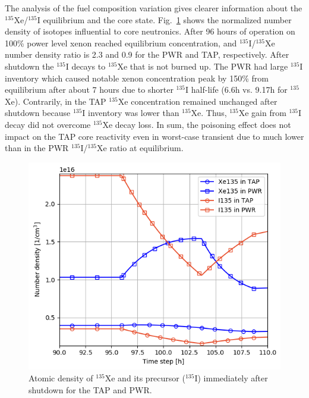 \documentclass{anstrans}
\begin{document}
The analysis of the fuel composition variation gives
clearer information about 
the $^{135}$Xe/$^{135}$I equilibrium and the core state. Fig.~\ref{fig:compos} 
shows the normalized number density of isotopes influential
to core 
neutronics. After 96 hours of operation on 100\% power level xenon reached 
equilibrium concentration, and $^{135}$I/$^{135}$Xe number density ratio is 
2.3 and 0.9 for the \gls{PWR} and \gls{TAP}, respectively. After shutdown the 
$^{135}$I decays to $^{135}$Xe that is not burned up. The \gls{PWR} had large 
$^{135}$I inventory which caused notable xenon concentration peak by 150\% 
from equilibrium after about 7 hours due to shorter $^{135}$I half-life (6.6h 
vs. 9.17h for $^{135}$Xe). Contrarily, in the \gls{TAP} $^{135}$Xe 
concentration remained unchanged after shutdown because $^{135}$I inventory 
was lower than $^{135}$Xe. Thus, $^{135}$Xe gain from $^{135}$I decay did not 
overcome $^{135}$Xe decay loss. In sum, the poisoning effect does not impact  
on the \gls{TAP} core reactivity even in worst-case transient due to 
much lower than in the \gls{PWR} $^{135}$I/$^{135}$Xe ratio at equilibrium.
\begin{figure}[htbp!] %
        \centering
        \includegraphics[width=1.07\linewidth]{tap_vs_pwr_xe_i_density.png}
        \caption{Atomic density of $^{135}$Xe and its precursor ($^{135}$I) 
        immediately after shutdown for the \gls{TAP} and \gls{PWR}.}
        \vspace{-0.2in}
        \label{fig:compos}
\end{figure}
\end{document}
